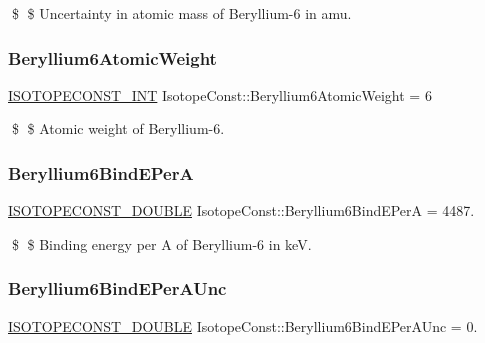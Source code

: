\$ \$ Uncertainty in atomic mass of Beryllium-\/6 in amu. \mbox{\label{group___isotope_const-_beryllium-_be6_gac60b4f1a8a3c96352b1087bd8c11ffa8}} 
\subsubsection{\texorpdfstring{Beryllium6\+Atomic\+Weight}{Beryllium6AtomicWeight}}
{\footnotesize\ttfamily \mbox{\hyperlink{group___isotope_const-_macros_ga5f18360b3e99483a35c32d789e62621c}{I\+S\+O\+T\+O\+P\+E\+C\+O\+N\+S\+T\+\_\+\+I\+NT}} Isotope\+Const\+::\+Beryllium6\+Atomic\+Weight = 6}

\$ \$ Atomic weight of Beryllium-\/6. \mbox{\label{group___isotope_const-_beryllium-_be6_ga3ea700b479c3da2a8ee7af9b8cfd920a}} 
\subsubsection{\texorpdfstring{Beryllium6\+Bind\+E\+PerA}{Beryllium6BindEPerA}}
{\footnotesize\ttfamily \mbox{\hyperlink{group___isotope_const-_macros_ga8f45a7272ce02c0b4c65c44636ed719a}{I\+S\+O\+T\+O\+P\+E\+C\+O\+N\+S\+T\+\_\+\+D\+O\+U\+B\+LE}} Isotope\+Const\+::\+Beryllium6\+Bind\+E\+PerA = 4487.}

\$ \$ Binding energy per A of Beryllium-\/6 in keV. \mbox{\label{group___isotope_const-_beryllium-_be6_ga70e8ef1d109f095dd33708326649c210}} 
\subsubsection{\texorpdfstring{Beryllium6\+Bind\+E\+Per\+A\+Unc}{Beryllium6BindEPerAUnc}}
{\footnotesize\ttfamily \mbox{\hyperlink{group___isotope_const-_macros_ga8f45a7272ce02c0b4c65c44636ed719a}{I\+S\+O\+T\+O\+P\+E\+C\+O\+N\+S\+T\+\_\+\+D\+O\+U\+B\+LE}} Isotope\+Const\+::\+Beryllium6\+Bind\+E\+Per\+A\+Unc = 0.}

